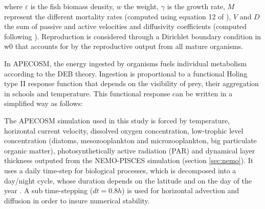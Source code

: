 where $\varepsilon$  is the fish biomass density, $w$ the weight, $\gamma$ is the growth rate, $M$ represent the different mortality rates (computed using equation 12 of \citealt{mauryIndividualsPopulationsCommunities2013}), $V$ and $D$ the sum of passive and active velocities and diffusivity coefficients (computed following \citealt{faugerasAdvectiondiffusionreactionSizestructuredFish2005}). Reproduction is considered through a Dirichlet boundary condition in w0 that accounts for by the reproductive output from all mature organisms.

In APECOSM, the energy ingested by organisms fuels individual metabolism according to the DEB theory. Ingestion is proportional to a functional Holing type II response function that depends on the visibility of prey, their aggregation in schools and temperature. This functional response can be written in a simplified way as follows:


The APECOSM simulation used in this study is forced by temperature, horizontal current velocity, dissolved oxygen concentration, low-trophic level concentration (diatoms, mesozooplankton and microzooplankton, big particulate organic matter), photosynthetically active radiation (PAR) and dynamical layer thickness outputed from the NEMO-PISCES simulation (section \ref{sec:nemo}). It uses a daily time-step for biological processes, which is decomposed into a day/night cycle, whose duration depends on the latitude and on the day of the year \citep{forsytheModelComparisonDaylength1995}. A sub time-stepping ($dt =0.8h$) is used for horizontal advection and diffusion in order to insure numerical stability.

%
%

